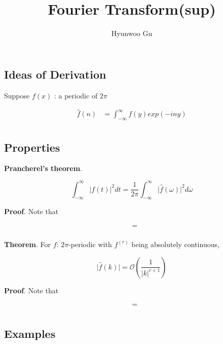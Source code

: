 \documentclass[12pt]{article}
\theoremstyle{nonumberbreak}
\begin{document}
\title{\textbf{Fourier Transform(sup)}}
\author{Hyunwoo Gu}
\date{}

\maketitle

\subsection*{Ideas of Derivation}

Suppose $f(x)$ : a periodic of $2\pi$

$$
\begin{aligned}
\hat{f}(n) &= \int_{-\infty}^\infty f(y) exp(-iny) \\[8pt]
\end{aligned}
$$


\subsection*{Properties}

\begin{theorem}
\textbf{Prancherel's theorem}. 

$$
\int_{-\infty}^\infty \vert f(t) \vert^2 dt = \frac{1}{2\pi} \int_{-\infty}^\infty \vert \hat{f}(\omega) \vert^2 d\omega
$$

\end{theorem}

\textbf{Proof}. Note that 

$$
\begin{aligned}
 &= \\[8pt]
\end{aligned}
$$




\begin{theorem}
\textbf{Theorem}. For $f$: $2\pi$-periodic with $f^{(r)}$ being absolutely continuous,

$$
\vert \hat{f}(k) \vert = \mathcal{O} \left( \frac{1}{|k|^{r+1}} \right)
$$
\end{theorem}

\textbf{Proof}. Note that 

$$
\begin{aligned}
 &= \\[8pt]
\end{aligned}
$$





\subsection*{Examples}
\end{document}
